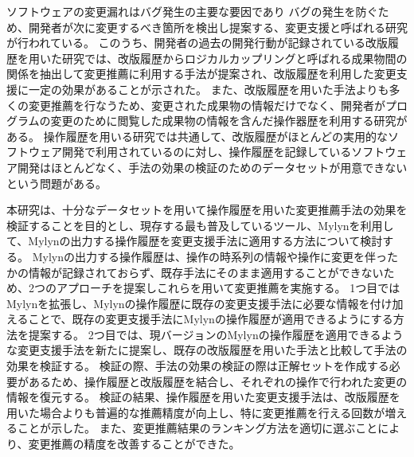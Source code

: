 ソフトウェアの変更漏れはバグ発生の主要な要因であり
バグの発生を防ぐため、開発者が次に変更するべき箇所を検出し提案する、変更支援と呼ばれる研究が行われている。
このうち、開発者の過去の開発行動が記録されている改版履歴を用いた研究では、改版履歴からロジカルカップリングと呼ばれる成果物間の関係を抽出して変更推薦に利用する手法が提案され、改版履歴を利用した変更支援に一定の効果があることが示された。
また、改版履歴を用いた手法よりも多くの変更推薦を行なうため、変更された成果物の情報だけでなく、開発者がプログラムの変更のために閲覧した成果物の情報を含んだ操作器歴を利用する研究がある。
操作履歴を用いる研究では共通して、改版履歴がほとんどの実用的なソフトウェア開発で利用されているのに対し、操作履歴を記録しているソフトウェア開発はほとんどなく、手法の効果の検証のためのデータセットが用意できないという問題がある。

本研究は、十分なデータセットを用いて操作履歴を用いた変更推薦手法の効果を検証することを目的とし、現存する最も普及しているツール、Mylynを利用して、Mylynの出力する操作履歴を変更支援手法に適用する方法について検討する。
Mylynの出力する操作履歴は、操作の時系列の情報や操作に変更を伴ったかの情報が記録されておらず、既存手法にそのまま適用することができないため、2つのアプローチを提案しこれらを用いて変更推薦を実施する。
1つ目ではMylynを拡張し、Mylynの操作履歴に既存の変更支援手法に必要な情報を付け加えることで、既存の変更支援手法にMylynの操作履歴が適用できるようにする方法を提案する。
2つ目では、現バージョンのMylynの操作履歴を適用できるような変更支援手法を新たに提案し、既存の改版履歴を用いた手法と比較して手法の効果を検証する。
検証の際、手法の効果の検証の際は正解セットを作成する必要があるため、操作履歴と改版履歴を結合し、それぞれの操作で行われた変更の情報を復元する。
検証の結果、操作履歴を用いた変更支援手法は、改版履歴を用いた場合よりも普遍的な推薦精度が向上し、特に変更推薦を行える回数が増えることが示した。
また、変更推薦結果のランキング方法を適切に選ぶことにより、変更推薦の精度を改善することができた。

